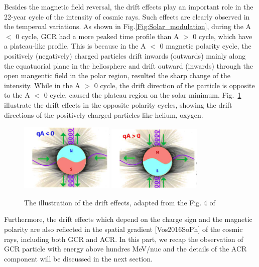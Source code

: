 Besides the magnetic field reversal, the drift effects play an important role in the 22-year cycle of the intensity of cosmic rays. Such effects are clearly observed in the temperoal variations.
As shown in Fig.\ref{Fig:Solar_modulation}, during the A $<$ 0 cycle, GCR had a more peaked time profile than A $>$ 0 cycle, which have a plateau-like profile. 
This is because in the A $<$ 0 magnetic polarity cycle, the positively (negatively) charged particles drift inwards (outwards) mainly along the equatuorial plane in the heliosphere and drift outward (inwards) through the open mangentic field in the polar region, resulted the sharp change of the intensity. While in the A $>$ 0 cycle, the drift direction of the particle is opposite to the A $<$ 0 cycle, caused the plateau region on the solar minimum. Fig.~\ref{Fig:drift_effect} illustrate the drift effects in the opposite polarity cycles, showing the drift directions of the positively charged particles like helium, oxygen.

\begin{figure}
	\centering
	\includegraphics[width = 0.4\textwidth]{images/drift_effect.png}
	\includegraphics[width = 0.4\textwidth]{images/drift_effect_2.png}
	\caption{The illustration of the drift effects, adapted from the Fig. 4 of \citep{Rankin2022ApJ}}
	\label{Fig:drift_effect}	
\end{figure}

Furthermore, the drift effects which depend on the charge sign and the magnetic polarity are also reflected in the spatial gradient [Vos2016SoPh] of the cosmic rays, including both \ac{GCR} and \ac{ACR}. In this part, we recap the observation of \ac{GCR} particle with energy above hundres MeV/nuc and the details of the \ac{ACR} component will be discussed in the next section. 

